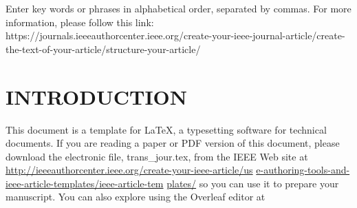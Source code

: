 \documentclass{IEEEoj-data}
\begin{document}
\begin{IEEEkeywords}
Enter key words or phrases in alphabetical order, separated by commas. For more information, please follow this link: https://journals.ieeeauthorcenter.ieee.org/create-your-ieee-journal-article/create-the-text-of-your-article/structure-your-article/
\end{IEEEkeywords}

\maketitle

\section*{INTRODUCTION}
This document is a template for \LaTeX, a typesetting software for technical documents. If you are 
reading a paper or PDF version of this document, please download the 
electronic file, trans\_jour.tex, from the IEEE Web site at \underline
{http://ieeeauthorcenter.ieee.org/create-your-ieee-article/us}\break
\underline{e-authoring-tools-and-ieee-article-templates/ieee-article-tem}\break
\underline{plates/} so you can use it to prepare your manuscript.
You can also explore using the Overleaf editor at 
\end{document}
